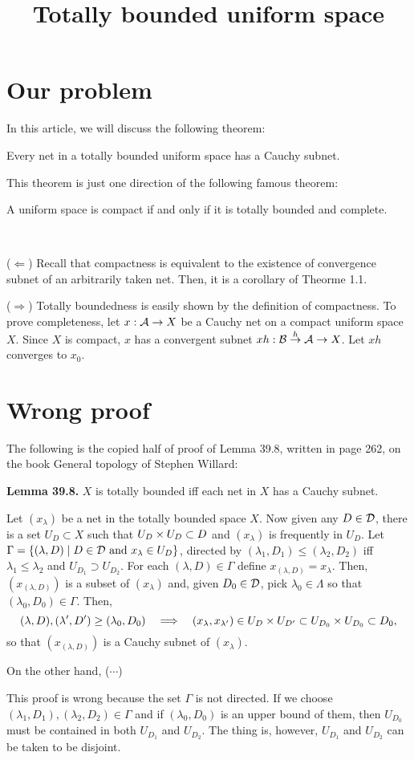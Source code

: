 \documentclass{../exp}
\title{Totally bounded uniform space}
\begin{document}
\maketitle

\section{Our problem}
In this article, we will discuss the following theorem:
\begin{thm}
Every net in a totally bounded uniform space has a Cauchy subnet.
\end{thm}
This theorem is just one direction of the following famous theorem:
\begin{thm}
A uniform space is compact if and only if it is totally bounded and complete.
\end{thm}
\begin{pf}\,

($\Leftarrow$)
Recall that compactness is equivalent to the existence of convergence subnet of an arbitrarily taken net.
Then, it is a corollary of Theorme 1.1.

($\Rightarrow$)
Totally boundedness is easily shown by the definition of compactness.
To prove completeness, let $x:\cA\to X$ be a Cauchy net on a compact uniform space $X$.
Since $X$ is compact, $x$ has a convergent subnet $xh:\cB\to{h}\cA\to X$.
Let $xh$ converges to $x_0$.
\end{pf}


\section{Wrong proof}
The following is the copied half of proof of Lemma 39.8, written in page 262, on the book General topology of Stephen Willard:
\bigskip

\noindent\textbf{Lemma 39.8.}
$X$ is totally bounded iff each net in $X$ has a Cauchy subnet.
\begin{pf}
Let $(x_\lambda)$ be a net in the totally bounded space $X$.
Now given any $D\in\mathcal{D}$, there is a set $U_D\subset X$ such that $U_D\times U_D\subset D$ and $(x_\lambda)$ is frequently in $U_D$.
Let $\Gamma=\{(\lambda,D)\mid D\in\mathcal{D}\text{ and }x_\lambda\in U_D\}$, directed by $(\lambda_1,D_1)\le(\lambda_2,D_2)$ iff $\lambda_1\le\lambda_2$ and $U_{D_1}\supset U_{D_2}$.
For each $(\lambda,D)\in\Gamma$ define $x_{(\lambda,D)}=x_\lambda$.
Then, $(x_{(\lambda,D)})$ is a subset of $(x_\lambda)$ and, given $D_0\in\mathcal{D}$, pick $\lambda_0\in\Lambda$ so that $(\lambda_0,D_0)\in\Gamma$.
Then,
\[(\lambda,D),(\lambda',D')\ge(\lambda_0,D_0)\impl(x_\lambda,x_{\lambda'})\in U_D\x U_{D'}\subset U_{D_0}\x U_{D_0}\subset D_0,\]
so that $(x_{(\lambda,D)})$ is a Cauchy subnet of $(x_\lambda)$.

On the other hand, ($\cdots$)
\end{pf}
\bigskip
This proof is wrong because the set $\Gamma$ is not directed.
If we choose $(\lambda_1,D_1),(\lambda_2,D_2)\in\Gamma$ and if $(\lambda_0,D_0)$ is an upper bound of them, then $U_{D_0}$ must be contained in both $U_{D_1}$ and $U_{D_2}$.
The thing is, however, $U_{D_1}$ and $U_{D_2}$ can be taken to be disjoint.
\end{document}
